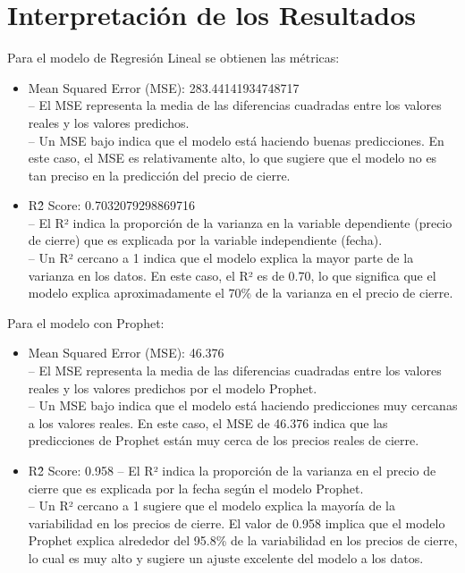 \section{Interpretación de los Resultados}
\label{sec:interpretacion_resultados}

Para el modelo de Regresión Lineal se obtienen las métricas:
\begin{itemize}
    \item  Mean Squared Error (MSE): 283.44141934748717 \\
    – El MSE representa la media de las diferencias cuadradas entre los valores reales y los valores predichos. \\
    – Un MSE bajo indica que el modelo está haciendo buenas predicciones. En este caso, el MSE es relativamente alto, lo que sugiere que el modelo no es tan preciso en la predicción del precio de cierre. \\
    \item R\^2 Score: 0.7032079298869716 \\
    – El R² indica la proporción de la varianza en la variable dependiente (precio de cierre) que es explicada por la variable independiente (fecha).\\
    – Un R² cercano a 1 indica que el modelo explica la mayor parte de la varianza en los datos. En este caso, el R² es de 0.70, lo que significa que el modelo explica aproximadamente el 70\% de la varianza en el precio de cierre.
\end{itemize}
Para el modelo con Prophet:
\begin{itemize}
    \item Mean Squared Error (MSE): 46.376 \\
    – El MSE representa la media de las diferencias cuadradas entre los valores reales y los valores predichos por el modelo Prophet. \\
    – Un MSE bajo indica que el modelo está haciendo predicciones muy cercanas a los valores reales. En este caso, el MSE de 46.376 indica que las predicciones de Prophet están muy cerca de los precios reales de cierre.
    \item R\^2 Score: 0.958
    – El R² indica la proporción de la varianza en el precio de cierre que es explicada por la fecha según el modelo Prophet. \\
    – Un R² cercano a 1 sugiere que el modelo explica la mayoría de la variabilidad en los precios de cierre. El valor de 0.958 implica que el modelo Prophet explica alrededor del 95.8\% de la variabilidad en los precios de cierre, lo cual es muy alto y sugiere un ajuste excelente del modelo a los datos.
\end{itemize}

